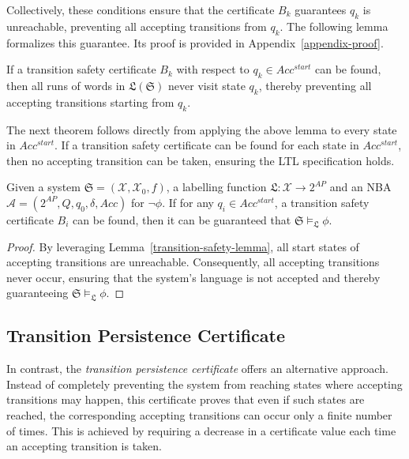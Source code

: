 Collectively, these conditions ensure that the certificate $B_k$ guarantees $q_k$ is unreachable, preventing all accepting transitions from $q_k$. The following lemma formalizes this guarantee. Its proof is provided in Appendix~\ref{appendix-proof}.

\begin{lemma}
  \label{transition-safety-lemma}
  If a transition safety certificate $B_k$ with respect to $q_k \in Acc^{start}$ can be found, then all runs of words in $\mathfrak{L}(\mathfrak{S})$ never visit state $q_k$, thereby preventing all accepting transitions starting from $q_k$.
\end{lemma}

The next theorem follows directly from applying the above lemma to every state in $Acc^{start}$. If a transition safety certificate can be found for each state in $Acc^{start}$, then no accepting transition can be taken, ensuring the LTL specification holds.

\begin{theorem}
  \label{transition-safety-LTL}
  Given a system $\mathfrak{S} = (\mathcal{X}, \mathcal{X}_0, f)$, a labelling function $\mathfrak{L}:\mathcal{X} \rightarrow 2^{AP}$ and an NBA $\mathcal{A} = (2^{AP}, Q, q_0, \delta, Acc)$ for $\neg\phi$. If for any $q_i \in Acc^{start}$, a transition safety certificate $B_i$ can be found, then it can be guaranteed that $\mathfrak{S} \models_{\mathfrak{L}} \phi$.
\end{theorem}

\begin{proof}
By leveraging Lemma~\ref{transition-safety-lemma}, all start states of accepting transitions are unreachable. Consequently, all accepting transitions never occur, ensuring that the system's language is not accepted and thereby guaranteeing $\mathfrak{S} \models_{\mathfrak{L}} \phi$.
\end{proof}

\subsection{Transition Persistence Certificate}
In contrast, the \emph{transition persistence certificate} offers an alternative approach. Instead of completely preventing the system from reaching states where accepting transitions may happen, this certificate proves that even if such states are reached, the corresponding accepting transitions can occur only a finite number of times. This is achieved by requiring a decrease in a certificate value each time an accepting transition is taken.


